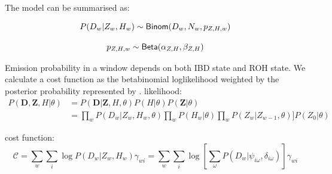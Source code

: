 \documentclass[12pt, letterpaper]{article}
\newcommand{\BZ}{\mathbf{Z}}
\begin{document}
The model can be summarised as:

\begin{equation}\label{eq:6}
P(D_w|Z_w,H_w) \sim {\sf Binom}(D_w, N_w, p_{Z,H,w})
\end{equation}

\begin{equation}\label{eq:7}
p_{Z,H,w} \sim {\sf Beta}(\alpha_{Z,H}, \beta_{Z,H})
\end{equation}

Emission probability in a window depends on both IBD state and ROH state. We calculate a cost function as the betabinomial loglikelihood weighted by the posterior probability represented by \gamma.
likelihood:
\begin{align}
P(\mathbf{D},\BZ, H|\theta) &= P(\mathbf{D}|\mathbf{Z},H,\theta) P(H |\theta) P(\BZ|\theta)\nonumber\\
&= \prod_{w}  P(D_w|Z_w,  H_w, \theta) \prod_w P(H_w | \theta) \prod_{w} P(Z_w|Z_{w-1}, \theta)] P(Z_0| \theta) 
\end{align}

cost function:
\begin{equation}
    \mathcal{C} = 
       \sum_{w} \sum_{i} \log P(D_{w}|Z_w, H_w)\gamma_{wi}=
    \sum_{w} \sum_{i} 
    \log \left[\sum_{\omega}P(D_{w}|\psi_{i\omega},\delta_{i\omega}) \right] \gamma_{wi}
\end{equation}
\end{document}
